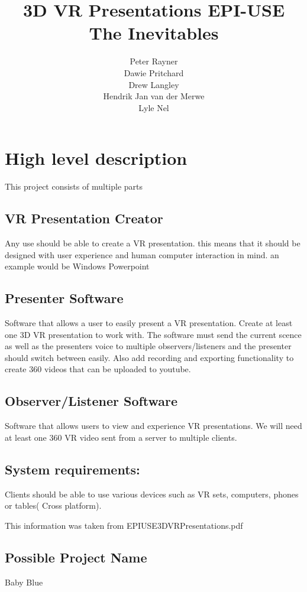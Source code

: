 \documentclass{article}
\title{3D VR Presentations EPI-USE \\
The Inevitables
}
\author{  
            Peter Rayner\\
            Dawie Pritchard\\
            Drew Langley\\
            Hendrik Jan van der Merwe\\
            Lyle Nel\\
        }
\begin{document}
\maketitle

\newpage

\tableofcontents

\newpage


\section{High level description}
This project consists of multiple parts
\subsection{VR Presentation Creator}
Any use should be able to create a VR presentation. this means that it should be designed with user experience and human computer interaction in mind.
an example would be Windows Powerpoint

\subsection{Presenter Software}
Software that allows a user to easily present a VR presentation. Create at least one 3D VR presentation to work with. The software must send the current scence as well as the presenters voice to multiple observers/listeners and the presenter should switch between easily. Also add recording and exporting functionality to create 360 videos that can be uploaded to youtube.

\subsection{Observer/Listener Software}
Software that allows users to view and experience VR presentations. We will need at least one 360 VR video sent from a server to multiple clients. 


\subsection{System requirements:}
Clients should be able to use various devices such as VR sets, computers, phones or tables( Cross platform).

This information was taken from EPIUSE3DVRPresentations.pdf

\subsection{Possible Project Name}
Baby Blue
\end{document}
